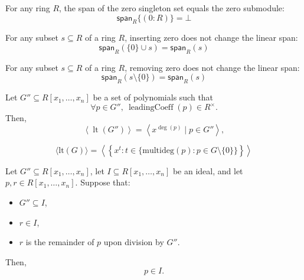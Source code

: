 \begin{lemma}\label{span_singleton_zero}

  \leanok
  For any ring \( R \), the span of the zero singleton set equals the zero submodule:
\[
\mathsf{span}_R \{(0 : R)\} = \bot
\]

\end{lemma}

\begin{lemma}\label{span_insert_zero}

  \leanok
  For any subset $s \subseteq R$ of a ring $R$, inserting zero does not change the linear span:
\[
\mathsf{span}_R(\{0\} \cup s) = \mathsf{span}_R(s)
\]

\end{lemma}

\begin{lemma}\label{span_sdiff_singleton_zero}
  \leanok
  For any subset $s \subseteq R$ of a ring $R$, removing zero does not change the linear span:
\[
\mathsf{span}_R(s \setminus \{0\}) = \mathsf{span}_R(s)
\]

\end{lemma}

\begin{lemma}\label{leadingTerm_ideal_span_monomial}
  \leanok
  Let \( G'' \subseteq R[x_1, \dots, x_n] \) be a set of polynomials such that
\[
\forall p \in G'',\ \operatorname{leadingCoeff}(p) \in R^\times.
\]
Then,
\[
\left\langle \operatorname{lt}(G'') \right\rangle = \left\langle x^{\deg(p)} \mid p \in G'' \right\rangle,
\]

\end{lemma}

\begin{lemma}\label{leadingTerm_ideal_span_monomial'}
  \leanok
  \[
\langle \mathrm{lt}(G) \rangle = \left\langle \left\{ x^t : t \in \{ \mathrm{multideg}(p) : p \in G \setminus \{0\} \} \right\} \right\rangle
\]

\end{lemma}

\begin{lemma}\label{mem_ideal_of_remainder_mem_ideal}
  \leanok
  Let \( G'' \subseteq R[x_1, \dots, x_n] \), let \( I \subseteq R[x_1, \dots, x_n] \) be an ideal,
and let \( p, r \in R[x_1, \dots, x_n] \). Suppose that:
\begin{itemize}
\item \( G'' \subseteq I \),
\item \( r \in I \),
\item \( r \) is the remainder of \( p \) upon division by \( G'' \).
\end{itemize}
Then,
\[
p \in I.
\]

\end{lemma}

